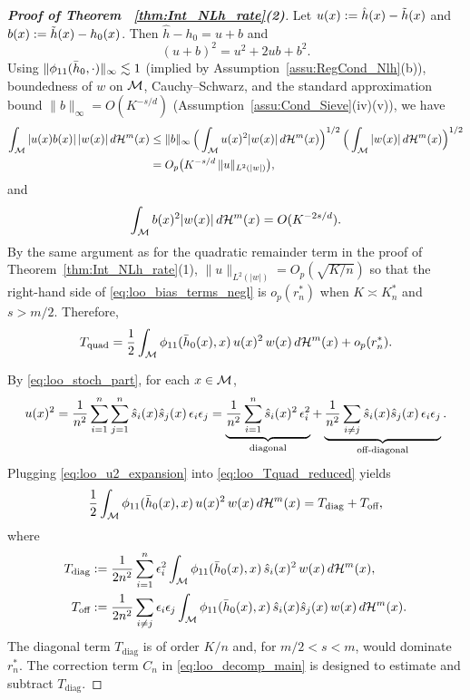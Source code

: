 \documentclass[12pt,american]{article}
\newcommand{\cH}{\mathcal{H}}
\theoremstyle{definition}
\theoremstyle{plain}
\theoremstyle{definition}
\theoremstyle{plain}
\theoremstyle{plain}
\theoremstyle{plain}
\theoremstyle{plain}
\theoremstyle{plain}
\begin{document}
\begin{proof}[\textbf{Proof of Theorem ~\ref{thm:Int_NLh_rate}(2)}]
\smallskip
Let $u(x):=\hat h(x)-\tilde{h}(x)$ and $b(x):=\tilde{h}(x)-h_0(x)$.
Then $\hat h-h_0=u+b$ and
\begin{equation}\label{eq:loo_u_plus_b_sq}
(u+b)^2=u^2+2ub+b^2.
\end{equation}
Using $\|\phi_{11}(\bar h_0,\cdot)\|_\infty\lesssim 1$ (implied by Assumption~\ref{assu:RegCond_Nlh}(b)), boundedness of $w$ on $\mathcal{M}$, Cauchy--Schwarz, and the standard approximation bound $\|b\|_{\infty}=O(K^{-s/d})$ (Assumption~\ref{assu:Cond_Sieve}(iv)(v)), we have
\begin{align}\label{eq:loo_bias_terms_negl}
\int_{\cM}|u(x)b(x)|\,|w(x)|\,d\cH^m(x)
&\le \|b\|_\infty\,\Big(\int_{\cM}u(x)^2|w(x)|\,d\cH^m(x)\Big)^{1/2}\,\Big(\int_{\cM}|w(x)|\,d\cH^m(x)\Big)^{1/2}\\
&=O_p\big(K^{-s/d}\,\|u\|_{L^2(|w|)}\big),
\end{align}
and
\begin{equation}\label{eq:loo_bias_sq_negl}
\int_{\cM}b(x)^2|w(x)|\,d\cH^m(x)=O(K^{-2s/d}).
\end{equation}
By the same argument as for the quadratic remainder term in the proof of Theorem~\ref{thm:Int_NLh_rate}(1),
$\|u\|_{L^2(|w|)}=O_p(\sqrt{K/n})$ so that the right-hand side of \eqref{eq:loo_bias_terms_negl} is $o_p(r_n^*)$ when $K\asymp K_n^*$ and $s>m/2$. Therefore,
\begin{equation}\label{eq:loo_Tquad_reduced}
T_{\text{quad}}=\frac12\int_{\cM}\phi_{11}(\bar h_0(x),x)\,u(x)^2\,w(x)\,d\cH^m(x)+o_p(r_n^*).
\end{equation}

\smallskip
By \eqref{eq:loo_stoch_part}, for each $x\in\mathcal{M}$,
\begin{equation}\label{eq:loo_u2_expansion}
 u(x)^2
 =\frac{1}{n^2}\sum_{i=1}^n\sum_{j=1}^n \hat s_i(x)\hat s_j(x)\,\epsilon_i\epsilon_j
 =\underbrace{\frac{1}{n^2}\sum_{i=1}^n \hat s_i(x)^2\,\epsilon_i^2}_{\text{diagonal}}+\underbrace{\frac{1}{n^2}\sum_{i\ne j} \hat s_i(x)\hat s_j(x)\,\epsilon_i\epsilon_j}_{\text{off-diagonal}}.
\end{equation}
Plugging \eqref{eq:loo_u2_expansion} into \eqref{eq:loo_Tquad_reduced} yields
\begin{equation}\label{eq:loo_Tquad_diag_off}
\frac12\int_{\cM}\phi_{11}(\bar h_0(x),x)\,u(x)^2\,w(x)\,d\cH^m(x)
=T_{\text{diag}}+T_{\text{off}},
\end{equation}
where
\begin{align}
T_{\text{diag}}&:=\frac{1}{2n^2}\sum_{i=1}^n \e_i^2\int_{\cM}\phi_{11}(\bar h_0(x),x)\,\hat s_i(x)^2\,w(x)\,d\cH^m(x),\\
T_{\text{off}}&:=\frac{1}{2n^2}\sum_{i\ne j} \e_i\e_j\int_{\cM}\phi_{11}(\bar h_0(x),x)\,\hat s_i(x)\hat s_j(x)\,w(x)\,d\cH^m(x).
\end{align}
The diagonal term $T_{\text{diag}}$ is of order $K/n$ and, for $m/2<s<m$, would dominate $r_n^*$.
The correction term $C_n$ in \eqref{eq:loo_decomp_main} is designed to estimate and subtract $T_{\text{diag}}$.


\end{proof}
\end{document}
